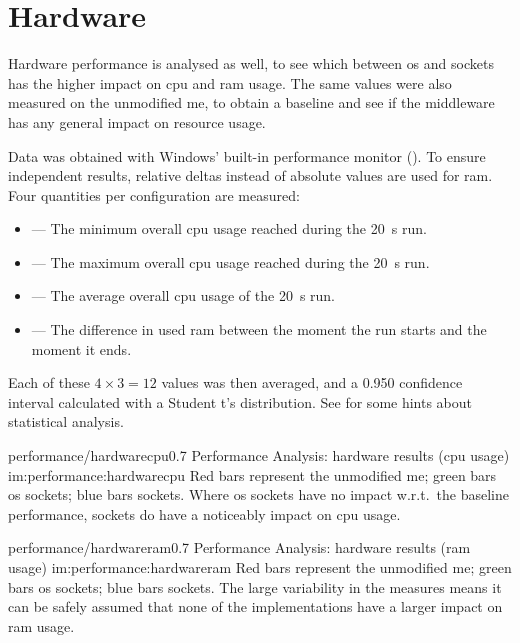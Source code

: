 \section{Hardware}\label{sc:performance:hardware}



Hardware performance is analysed as well, to see which between \gls{os} and  sockets has the higher impact on \gls{cpu} and \gls{ram} usage. The same values were also measured on the unmodified \gls{me}, to obtain a baseline and see if the \gls{middleware} has any general impact on resource usage.

Data was obtained with Windows' built-in performance monitor (). To ensure independent results, relative deltas instead of absolute values are used for \gls{ram}. Four quantities per configuration are measured:

\begin{itemize}
	\item {} --- The minimum overall \gls{cpu} usage reached during the \SI{20}{\second} run.
	\item {} --- The maximum overall \gls{cpu} usage reached during the \SI{20}{\second} run.
	\item {} --- The average overall \gls{cpu} usage of the \SI{20}{\second} run.
	\item {} --- The difference in used \gls{ram} between the moment the run starts and the moment it ends.
\end{itemize}

\FLOATnoindent Each of these $4\times3=12$ values was then averaged, and a \num{0,950} confidence interval calculated with a Student t's distribution. See  for some hints about statistical analysis.

\begin{image}
	{performance/hardwarecpu}{0.7}
	{Performance Analysis: hardware results (\gls{cpu} usage)}
	{im:performance:hardwarecpu}
	{}
	{Red bars represent the unmodified \gls{me}; green bars \gls{os} sockets; blue bars  sockets. Where \gls{os} sockets have no impact w.r.t.\ the baseline performance,  sockets do have a noticeably impact on \gls{cpu} usage.}
\end{image}

\begin{image}
	{performance/hardwareram}{0.7}
	{Performance Analysis: hardware results (\gls{ram} usage)}
	{im:performance:hardwareram}
	{}
	{Red bars represent the unmodified \gls{me}; green bars \gls{os} sockets; blue bars  sockets. The large variability in the measures means it can be safely assumed that none of the implementations have a larger impact on \gls{ram} usage.}
\end{image}

